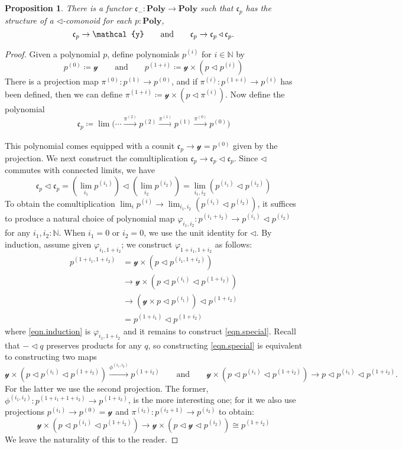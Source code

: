 \documentclass[11pt, one side, article]{memoir}
\theoremstyle{definition}
\theoremstyle{plain}
\newtheorem{proposition}[definitionx]{Proposition}
\newcommand{\Cat}[1]{\mathbf{#1}}%
\newcommand{\To}[2][]{\xrightarrow[#1]{#2}}
\newcommand{\nn}{\mathbb{N}}
\newcommand{\yon}{\mathcal{y}}
\newcommand{\poly}{\Cat{Poly}}
\newcommand{\tri}{\mathbin{\triangleleft}}
\newcommand{\cofree}{\mathfrak{c}}
\newcommand{\qqand}{\qquad\text{and}\qquad}
\newcommand{\coh}[1]{^{(#1)}}
\begin{document}
\begin{proposition}
There is a functor $\cofree_-\colon\poly\to\poly$ such that $\cofree_p$ has the structure of a $\tri$-comonoid for each $p:\poly$,
\[
\cofree_p\to\yon
\qqand
\cofree_p\to\cofree_p\tri\cofree_p.
\qedhere
\]
\end{proposition}
\begin{proof}
Given a polynomial $p$, define polynomials $p^{(i)}$ for $i\in\nn$ by
\[
  p\coh{0}\coloneqq\yon
  \qqand
  p\coh{1+i}\coloneqq\yon\times\left(p\tri p\coh{i}\right)
\]
There is a projection map $\pi\coh{0}\colon p\coh{1}\to p\coh{0}$, and if $\pi\coh{i}\colon p\coh{1+i}\to p\coh{i}$ has been defined, then we can define $\pi\coh{1+i}\coloneqq \yon\times(p\tri\pi\coh{i})$. Now define the polynomial
\begin{equation}\label{eqn.construct_cofree}
\cofree_p\coloneqq\lim\big(\cdots\To{\pi\coh{2}}p\coh{2}\To{\pi\coh{1}}p\coh{1}\To{\pi\coh{0}}p\coh{0}\big)
\end{equation}

This polynomial comes equipped with a counit $\cofree_p\to\yon=p\coh{0}$ given by the projection. We next construct the comultiplication $\cofree_p\to\cofree_p\tri\cofree_p$. Since $\tri$ commutes with connected limits, we have
\[
  \cofree_p\tri\cofree_p=
  \left(\lim_{i_1}p\coh{i_1}\right)\tri\left(\lim_{i_2}p\coh{i_2}\right)=
  \lim_{i_1,i_2}\left(p\coh{i_1}\tri p\coh{i_2}\right)
\]
To obtain the comultiplication $\lim_ip\coh{i}\to\lim_{i_1,i_2}(p\coh{i_1}\tri p\coh{i_2})$, it suffices to produce a natural choice of polynomial map $\varphi_{i_1,i_2}\colon p\coh{i_1+i_2}\to p\coh{i_1}\tri p\coh{i_2}$ for any $i_1,i_2:\nn$. When $i_1=0$ or $i_2=0$, we use the unit identity for $\tri$. By induction, assume given $\varphi_{i_1,1+i_2}$; we construct $\varphi_{1+i_1,1+i_2}$ as follows:
\begin{align}
\nonumber
  p\coh{1+i_1,1+i_2}&=
  \yon\times \left(p\tri p\coh{i_1,1+i_2}\right)\\&\to
\label{eqn.induction}
  \yon\times \left(p\tri p\coh{i_1}\tri p\coh{1+i_2}\right)\\&\to
\label{eqn.special}
  \left(\yon\times p\tri p\coh{i_1}\right)\tri p\coh{1+i_2}\\&=
\nonumber
  p\coh{1+i_1}\tri p\coh{1+i_2}
\end{align}
where \eqref{eqn.induction} is $\varphi_{i_1,1+i_2}$ and it remains to construct \eqref{eqn.special}. Recall that $-\tri q$ preserves products for any $q$, so constructing \eqref{eqn.special} is equivalent to constructing two maps
\[
\yon\times \left(p\tri p\coh{i_1}\tri p\coh{1+i_2}\right)\To{\phi\coh{i_1,i_2}} p\coh{1+i_2}
\qqand
\yon\times \left(p\tri p\coh{i_1}\tri p\coh{1+i_2}\right)\to p\tri p\coh{i_1}\tri p\coh{1+i_2}.
\]
For the latter we use the second projection. The former, $\phi\coh{i_1,i_2}\colon p\coh{1+i_1+1+i_2}\to p\coh{1+i_2}$, is the more interesting one; for it we also use projections $p\coh{i_1}\to p\coh{0}=\yon$ and $\pi\coh{i_2}\colon p\coh{i_2+1}\to p\coh{i_2}$ to obtain:
\[
\yon\times \left(p\tri p\coh{i_1}\tri p\coh{1+i_2}\right)\to
\yon\times \left(p\tri\yon\tri p\coh{i_2}\right)\cong p\coh{1+i_2}
\]
We leave the naturality of this to the reader.


\end{proof}
\end{document}
